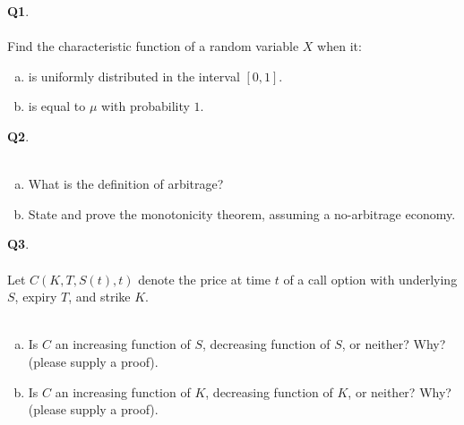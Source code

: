 \documentclass[12pt, oneside]{amsart}
\begin{document}
\vfill

\newpage
\noindent
\textbf{Q1}. \\ \\ 
Find the characteristic function of a random variable $X$ when it:
\\
\begin{enumerate}[(a)]
	\item is uniformly distributed in the interval $[0,1]$.
		\vspace{4in}
		\item is equal to $\mu$ with probability $1$.
\end{enumerate}
\newpage
\noindent
\textbf{Q2}. \\ \\
\begin{enumerate}[(a)]
	\item What is the definition of arbitrage?
		\vspace{2in}
	\item 
		State and prove the monotonicity theorem,
		assuming a no-arbitrage economy.
	\end{enumerate}
\newpage
\noindent
\textbf{Q3}.\\ \\ 
 Let $C(K, T, S(t), t)$ denote the price at time $t$ of a call option
			with underlying $S$, expiry $T$, and strike $K$. 
			\\ \\
\begin{enumerate}[(a)]
	\item Is $C$ an increasing function of $S$, decreasing function of $S$,
		or neither? Why? (please supply a proof).
			\vspace{5in}
    \item Is $C$ an increasing function of $K$, decreasing function of $K$,
			or neither? Why? (please supply a proof).
\end{enumerate}
\end{document}
